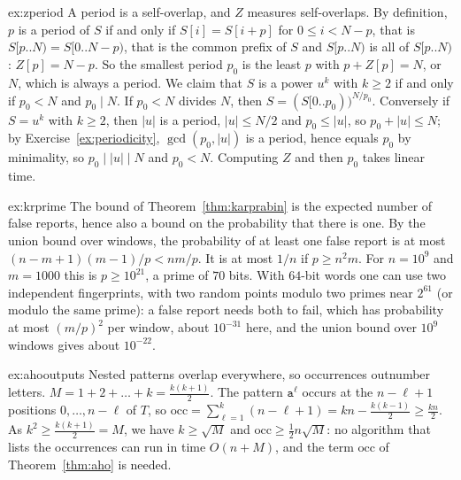 \begin{solution}{ex:zperiod}
\idea A period is a self-overlap, and $Z$ measures self-overlaps.
\writeup By definition, $p$ is a period of $S$ if and only if $S[i]=S[i+p]$ for $0\le i<N-p$, that is $S[p..N)=S[0..N-p)$, that is the common prefix of $S$ and $S[p..N)$ is all of $S[p..N)$: $Z[p]=N-p$. So the smallest period $p_0$ is the least $p$ with $p+Z[p]=N$, or $N$, which is always a period.
We claim that $S$ is a power $u^k$ with $k\ge2$ if and only if $p_0<N$ and $p_0\mid N$. If $p_0<N$ divides $N$, then $S=(S[0..p_0))^{N/p_0}$. Conversely if $S=u^k$ with $k\ge2$, then $|u|$ is a period, $|u|\le N/2$ and $p_0\le|u|$, so $p_0+|u|\le N$; by Exercise~\ref{ex:periodicity}, $\gcd(p_0,|u|)$ is a period, hence equals $p_0$ by minimality, so $p_0\mid|u|\mid N$ and $p_0<N$. Computing $Z$ and then $p_0$ takes linear time.
\end{solution}

\begin{solution}{ex:krprime}
\idea The bound of Theorem~\ref{thm:karprabin} is the expected number of false reports, hence also a bound on the probability that there is one.
\writeup By the union bound over windows, the probability of at least one false report is at most $(n-m+1)(m-1)/p<nm/p$. It is at most $1/n$ if $p\ge n^2m$. For $n=10^9$ and $m=1000$ this is $p\ge10^{21}$, a prime of $70$ bits. With $64$-bit words one can use two independent fingerprints, with two random points modulo two primes near $2^{61}$ (or modulo the same prime): a false report needs both to fail, which has probability at most $(m/p)^2$ per window, about $10^{-31}$ here, and the union bound over $10^9$ windows gives about $10^{-22}$.
\end{solution}

\begin{solution}{ex:ahooutputs}
\idea Nested patterns overlap everywhere, so occurrences outnumber letters.
\writeup $M=1+2+\dots+k=\frac{k(k+1)}2$. The pattern $\texttt a^\ell$ occurs at the $n-\ell+1$ positions $0,\dots,n-\ell$ of $T$, so $\mathrm{occ}=\sum_{\ell=1}^k(n-\ell+1)=kn-\frac{k(k-1)}2\ge\frac{kn}2$. As $k^2\ge\frac{k(k+1)}2=M$, we have $k\ge\sqrt M$ and $\mathrm{occ}\ge\frac12n\sqrt M$: no algorithm that lists the occurrences can run in time $O(n+M)$, and the term $\mathrm{occ}$ of Theorem~\ref{thm:aho} is needed.
\end{solution}

